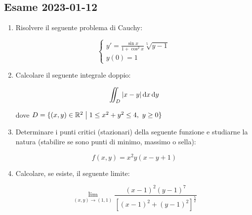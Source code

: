 \subsection{Esame 2023{-}01{-}12}

\begin{enumerate}
    \itemsep32pt
    \item Risolvere il seguente problema di Cauchy:

          \begin{equation*}
              \begin{cases}
                  y' = \frac{\sin x}{1 + \cos^{2} x} \sqrt[5]{y-1} \\[2mm]
                  y(0) = 1
              \end{cases}
          \end{equation*}

    \item Calcolare il seguente integrale doppio:

          \[
              \iint_{D} |x-y| \mathop{}\!\mathrm{d}{x}\mathop{}\!\mathrm{d}{y}
          \]

          dove \(D = \{(x,y) \in \mathbb{R}^{2} \;\big|\; 1 \le x^2 + y^2 \le 4,\ y \ge 0\} \)

    \item Determinare i punti critici (stazionari) della seguente funzione e studiarne la natura (stabilire se sono punti di minimo, massimo o sella):

          \[
              f(x,y) = x^{2}y(x-y+1)
          \]

    \item Calcolare, se esiste, il seguente limite:

          \[
              \lim_{(x,y) \rightarrow (1,1)}
              \frac
              {{(x-1)}^{2} {(y-1)}^{7}}
              {{\left[ {(x-1)}^{2} + {(y-1)}^{2} \right]}^{\frac{5}{2}}}
          \]

\end{enumerate}

